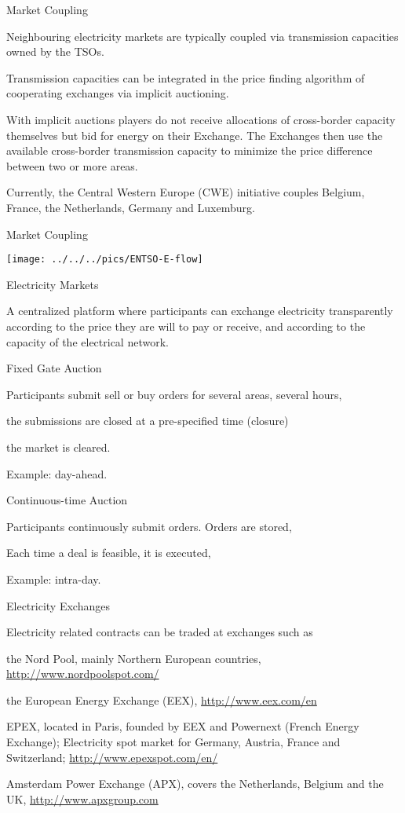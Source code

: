 {Market Coupling}
\item<1-> Neighbouring electricity markets are typically coupled via transmission capacities owned by the TSOs.
\item<2->  Transmission capacities can be integrated in the price finding algorithm of cooperating exchanges via implicit auctioning.
\item<3-> With implicit auctions  players do not  receive allocations of cross-border capacity themselves but bid for energy on their Exchange. The Exchanges then use the available cross-border transmission capacity to minimize the price difference between two or more areas.
\item<4->  Currently, the Central Western Europe (CWE) initiative couples Belgium, France, the Netherlands, Germany and Luxemburg.

{Market Coupling}
\begin{center}
\texttt{[image: ../../../pics/ENTSO-E-flow]}
\end{center}

{Electricity Markets}

A centralized platform where participants can exchange electricity transparently
according to the price they are will to pay or receive, and according to the capacity of
the electrical network.

\item<1-> Fixed Gate Auction
\item Participants submit sell or buy orders for several areas, several hours,
\item the submissions are closed at a pre-specified time (closure)
\item the market is cleared.
\item Example: day-ahead.
\item<2-> Continuous-time Auction
\item Participants continuously submit orders. Orders are stored,
\item Each time a deal is feasible, it is executed,
\item Example: intra-day.


{Electricity Exchanges}

Electricity related contracts  can be traded at exchanges such as
\item<1-> the Nord Pool, mainly Northern European countries, \url{http://www.nordpoolspot.com/}
\item<2-> the European Energy Exchange (EEX), \url{http://www.eex.com/en}
\item<3-> EPEX, located in Paris, founded by EEX and Powernext (French Energy Exchange);
Electricity spot market for Germany, Austria, France and Switzerland;
\url{http://www.epexspot.com/en/}
\item<4-> Amsterdam Power Exchange (APX), covers the Netherlands, Belgium and the UK, \url{http://www.apxgroup.com}

